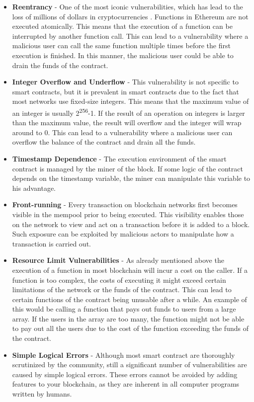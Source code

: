 \begin{itemize}
    \item \textbf{Reentrancy} - One of the most iconic vulnerabilities, which has lead to the loss of millions of dollars in cryptocurrencies \cite{pcaversaccio_chronological_nodate}. Functions in Ethereum are not executed atomically. This means that the execution of a function can be interrupted by another function call. This can lead to a vulnerability where a malicious user can call the same function multiple times before the first execution is finished. In this manner, the malicious user could be able to drain the funds of the contract.
    \item \textbf{Integer Overflow and Underflow} - This vulnerability is not specific to smart contracts, but it is prevalent in smart contracts due to the fact that most networks use fixed-size integers. This means that the maximum value of an integer is usually 2\textsuperscript{256}-1. If the result of an operation on integers is larger than the maximum value, the result will overflow and the integer will wrap around to 0. This can lead to a vulnerability where a malicious user can overflow the balance of the contract and drain all the funds.
    \item \textbf{Timestamp Dependence} - The execution environment of the smart contract is managed by the miner of the block. If some logic of the contract depends on the timestamp variable, the miner can manipulate this variable to his advantage.
    \item \textbf{Front-running} - Every transaction on blockchain networks first becomes visible in the mempool prior to being executed. This visibility enables those on the network to view and act on a transaction before it is added to a block. Such exposure can be exploited by malicious actors to manipulate how a transaction is carried out.
    \item \textbf{Resource Limit Vulnerabilities} - As already mentioned above the execution of a function in most blockchain will incur a cost on the caller. If a function is too complex, the costs of executing it might exceed certain limitations of the network or the funds of the contract. This can lead to certain functions of the contract being unusable after a while. An example of this would be calling a function that pays out funds to users from a large array. If the users in the array are too many, the function might not be able to pay out all the users due to the cost of the function exceeding the funds of the contract.
    \item \textbf{Simple Logical Errors} - Although most smart contract are thoroughly scrutinized by the community, still a significant number of vulnerabilities are caused by simple logical errors. These errors cannot be avoided by adding features to your blockchain, as they are inherent in all computer programs written by humans.
\end{itemize}

